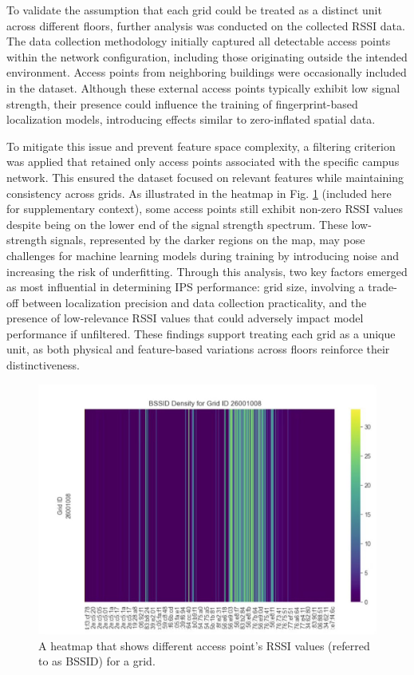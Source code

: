 \documentclass[runningheads]{llncs}
\begin{document}
To validate the assumption that each grid could be treated as a distinct unit across different floors, further analysis was conducted on the collected RSSI data. The data collection methodology initially captured all detectable access points within the network configuration, including those originating outside the intended environment. Access points from neighboring buildings were occasionally included in the dataset. Although these external access points typically exhibit low signal strength, their presence could influence the training of fingerprint-based localization models, introducing effects similar to zero-inflated spatial data.

To mitigate this issue and prevent feature space complexity, a filtering criterion was applied that retained only access points associated with the specific campus network. This ensured the dataset focused on relevant features while maintaining consistency across grids.
As illustrated in the heatmap in Fig. \ref{fig:heatmap008} (included here for supplementary context), some access points still exhibit non-zero RSSI values despite being on the lower end of the signal strength spectrum. These low-strength signals, represented by the darker regions on the map, may pose challenges for machine learning models during training by introducing noise and increasing the risk of underfitting.
Through this analysis, two key factors emerged as most influential in determining IPS performance: grid size, involving a trade-off between localization precision and data collection practicality, and the presence of low-relevance RSSI values that could adversely impact model performance if unfiltered. These findings support treating each grid as a unique unit, as both physical and feature-based variations across floors reinforce their distinctiveness.

\begin{figure}[htbp]
	\centerline{\includegraphics[scale=0.15]{meth3.jpg}}
	\caption{A heatmap that shows different access point’s RSSI values (referred to as BSSID) for a grid.}
	\label{fig:heatmap008}
\end{figure}
\end{document}
